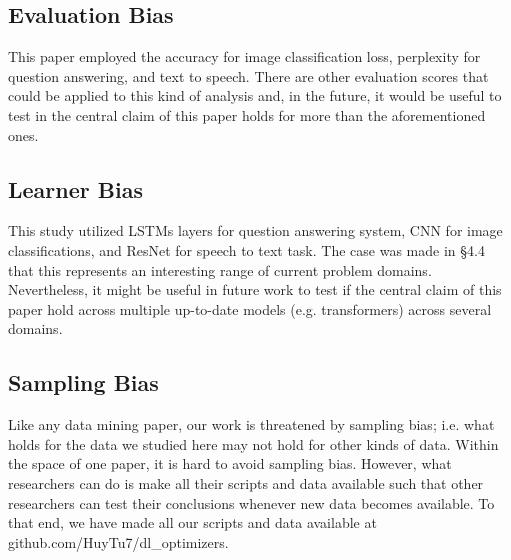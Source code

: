 \subsection{Evaluation Bias}

This paper employed the accuracy for image classification loss, perplexity for question answering, and text to speech. There are other evaluation scores that could be applied to this kind of analysis
and, in the future, it would be useful to test in the central claim of this paper holds for more than the aforementioned ones.

\subsection{Learner Bias}

This study utilized LSTMs layers for question answering system, CNN for image classifications, and ResNet for speech to text task. 
The case was made in \S4.4 that this represents an interesting range of current problem domains.
Nevertheless, it might be useful in future work to test if the central claim of this paper 
hold across multiple up-to-date models (e.g. transformers) across several domains.

\subsection{Sampling Bias}

Like any data mining paper,
our work is threatened by sampling bias; i.e. what holds for the data we studied here may
not hold for other kinds of data. 
Within the space of one paper, it is hard to avoid sampling bias.
However, what researchers can do is make all their scripts and data available
such that other researchers can test their conclusions whenever new data becomes available. To that end, we have made all our scripts and data available at github.com/HuyTu7/dl\_optimizers.